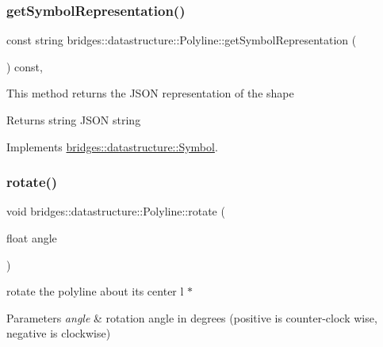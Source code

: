 \subsubsection{\texorpdfstring{get\+Symbol\+Representation()}{getSymbolRepresentation()}}
{\footnotesize\ttfamily const string bridges\+::datastructure\+::\+Polyline\+::get\+Symbol\+Representation (\begin{DoxyParamCaption}{ }\end{DoxyParamCaption}) const\hspace{0.3cm}{\ttfamily [inline]}, {\ttfamily [virtual]}}

This method returns the J\+S\+ON representation of the shape

\begin{DoxyReturn}{Returns}
string J\+S\+ON string 
\end{DoxyReturn}


Implements \mbox{\hyperlink{classbridges_1_1datastructure_1_1_symbol_a8044b3da559dcd9de8510ae339f126c8}{bridges\+::datastructure\+::\+Symbol}}.

\mbox{\label{classbridges_1_1datastructure_1_1_polyline_aa61978ccbb0b086dc8f55e90ccca23c9}} 
\subsubsection{\texorpdfstring{rotate()}{rotate()}}
{\footnotesize\ttfamily void bridges\+::datastructure\+::\+Polyline\+::rotate (\begin{DoxyParamCaption}\item[{float}]{angle }\end{DoxyParamCaption})\hspace{0.3cm}{\ttfamily [inline]}}



rotate the polyline about its center l $\ast$ 


\begin{DoxyParams}{Parameters}
{\em angle} & rotation angle in degrees (positive is counter-\/clock wise, negative is clockwise) \\
\hline
\end{DoxyParams}
\mbox{\label{classbridges_1_1datastructure_1_1_polyline_adf06f484d9a48960de84ed3646903f3a}} 
